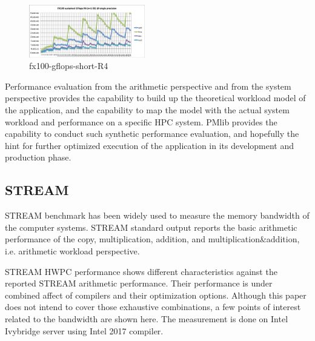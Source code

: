 \documentclass[conference]{IEEEtran}
\begin{document}
\begin{figure}[tb]
\centering
\includegraphics[width=0.45\textwidth]{figs/fx100-gflops-short-R4.pdf}
\caption{fx100-gflops-short-R4}
\label{fig:fx100-gflops-short-R4}
\end{figure}

Performance evaluation from the arithmetic perspective and from the
system perspective provides the capability to build up the theoretical
workload model of the application,
and the capability to map the model with the actual system workload
and performance on a specific HPC system.
PMlib provides the capability to conduct such synthetic performance
evaluation, and hopefully the hint for further optimized execution of
the application in its development and production phase.


\subsection{STREAM}
\label{subsection:STREAM}
STREAM benchmark \cite{stream:1995}
has been widely used to measure the memory bandwidth of the computer systems.
STREAM standard output reports the
basic arithmetic performance of the copy, multiplication, addition,
and multiplication\&addition, i.e. arithmetic workload perspective.

STREAM HWPC performance shows different characteristics against
the reported STREAM arithmetic performance. Their performance is under
combined affect of compilers and their optimization options.
Although this paper does not intend to cover those exhaustive combinations,
a few points of interest related to the bandwidth are shown here.
%
The measurement is done on Intel Ivybridge server using Intel 2017 compiler.
\end{document}
